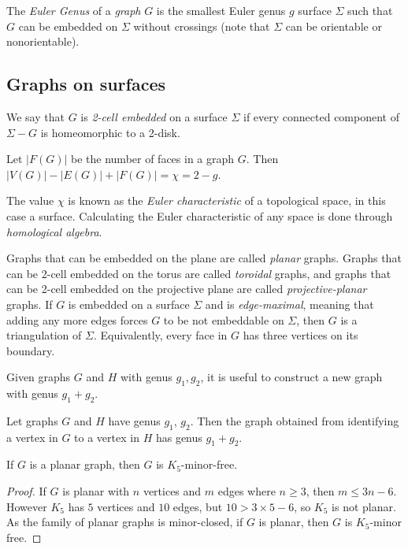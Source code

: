 The \textit{Euler Genus} of a \textit{graph} \(G\) is the smallest Euler genus \(g\) surface \(\Sigma\) such that \(G\) can be embedded on \(\Sigma\) without crossings (note that \(\Sigma\) can be orientable or nonorientable). 


\subsection{Graphs on surfaces}

We say that $G$ is \textit{2-cell embedded} on a surface $\Sigma$ if every connected component of $\Sigma - G$ is homeomorphic to a 2-disk. 

\begin{theorem}\label{thm:Euler_surfaces}
	Let \(|F(G)|\) be the number of faces in a graph \(G\). Then \(|V(G)| - |E(G)| + |F(G)| = \chi = 2 - g\). 
\end{theorem}
The value $\chi$ is known as the \textit{Euler characteristic} of a topological space, in this case a surface. Calculating the Euler characteristic of any space is done through \textit{homological algebra}. 

Graphs that can be embedded on the plane are called \textit{planar} graphs. Graphs that can be 2-cell embedded on the torus are called \textit{toroidal} graphs, and graphs that can be 2-cell embedded on the projective plane are called \textit{projective-planar} graphs.
If $G$ is embedded on a surface $\Sigma$ and is \textit{edge-maximal}, meaning that adding any more edges forces $G$ to be not embeddable on $\Sigma$, then $G$ is a triangulation of $\Sigma$. Equivalently, every face in $G$ has three vertices on its boundary. 

Given graphs $G$ and $H$ with genus $g_1, g_2$, it is useful to construct a new graph with genus $g_1 + g_2$. 
\begin{theorem}\label{thm:additivity_genus}
	Let graphs $G$ and $H$ have genus $g_1$, $g_2$. Then the graph obtained from identifying a vertex in $G$ to a vertex in $H$ has genus $g_1 + g_2$. 
\end{theorem}

\begin{theorem}\label{thm:K5_Free_Planar}
	If \(G\) is a planar graph, then \(G\) is \(K_5\)-minor-free.
\end{theorem}
\begin{proof}
	If \(G\) is planar with \(n\) vertices and \(m\) edges where $n \geq 3$, then \(m \leq 3n -6\).
	However \(K_5\) has \(5\) vertices and \(10\) edges, but  \( 10 > 3 \times 5 - 6\), so \(K_5\) is not planar. As the family of planar graphs is minor-closed, if \(G\) is planar, then $G$ is \(K_5\)-minor free.
\end{proof}

